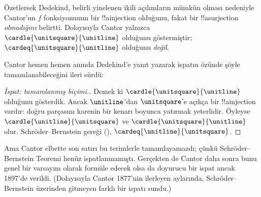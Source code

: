 Özetlersek Dedekind, belirli yinelenen ikili açılımların mümkün olması
nedeniyle Cantor'un $f$ fonksiyonunun bir !!a{injection} olduğunu, fakat bir
!!a{surjection} \emph{olmadığını} belirtti. Dolayısıyla Cantor yalnızca
$\cardle{\unitsquare}{\unitline}$ olduğunu göstermiştir;
$\cardeq{\unitsquare}{\unitline}$ olduğunu \emph{değil}.

Cantor hemen hemen anında Dedekind'e yanıt yazarak ispatın özünde şöyle
tamamlanabileceğini ileri sürdü:

\begin{proof}[İspat: tamamlanmış biçimi.] 
Demek ki $\cardle{\unitsquare}{\unitline}$ olduğunu gösterdik. Ancak
$\unitline$'dan $\unitsquare$'e açıkça bir !!a{injection} vardır: doğru
parçasını karenin bir kenarı boyunca yatırmak yeterlidir. Öyleyse
$\cardle{\unitline}{\unitsquare}$ ve
$\cardle{\unitsquare}{\unitline}$ olur. Schr\"{o}der--Bernstein gereği
(),
$\cardeq{\unitline}{\unitsquare}$.
\end{proof}

Ama Cantor elbette son satırı bu terimlerle tamamlayamazdı; çünkü
Schr\"{o}der--Bernstein Teoremi henüz ispatlanmamıştı. Gerçekten de Cantor
daha sonra bunu genel bir varsayım olarak formüle edecek olsa da doyurucu bir
ispat ancak 1897'de verildi. (Dolayısıyla Cantor 1877'nin ilerleyen
aylarında, Schr\"{o}der--Bernstein üzerinden gitmeyen farklı bir
 ispatı sundu.)

